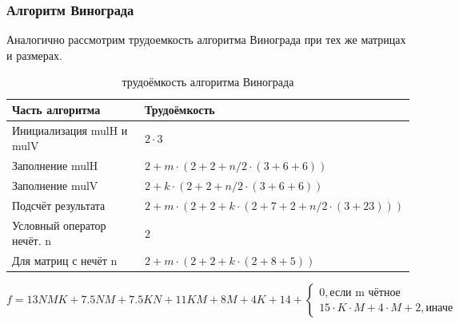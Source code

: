 \documentclass[12pt,a4paper]{article}
\numberwithin{equation}{section}
\begin{document}
\subsubsection{Алгоритм Винограда}
Аналогично рассмотрим трудоемкость алгоритма Винограда при тех же матрицах и размерах.
\begin{table}[h]
\label{tabular:timesandtenses}
\begin{center}
\begin{tabular}{ l  l  }
    Часть алгоритма            & Трудоёмкость                                                        \\ \hline
    Инициализация mulH и mulV  & $2 \cdot 3$                                                         \\
    Заполнение mulH            & $2 + m \cdot (2 + 2 + n / 2 \cdot (3 + 6 + 6))$                     \\ 
    Заполнение mulV            & $2 + k \cdot (2 + 2 + n / 2 \cdot (3 + 6 + 6))$                     \\ 
    Подсчёт результата         & $2 + m \cdot (2 + 2 + k \cdot (2 + 7 + 2 + n / 2 \cdot (3 + 23)))$  \\ 
    Условный оператор нечёт. n & $2$                                                                 \\ 
    Для матриц с нечёт n       & $2 + m \cdot (2 + 2 + k \cdot (2 + 8 + 5))$                         \\ 
\end{tabular}
\caption{трудоёмкость алгоритма Винограда}  
\end{center}
\end{table}
\begin{displaymath}
    f = 13NMK + 7.5NM + 7.5KN + 11KM + 8M + 4K + 14 + \left \{ 
    \begin{array}{ll}  
        0, \textrm{если m чётное} \\ 
        15 \cdot K \cdot M + 4 \cdot M + 2, \textrm{иначе} 
    \end{array} \right.
\end{displaymath}
\end{document}
